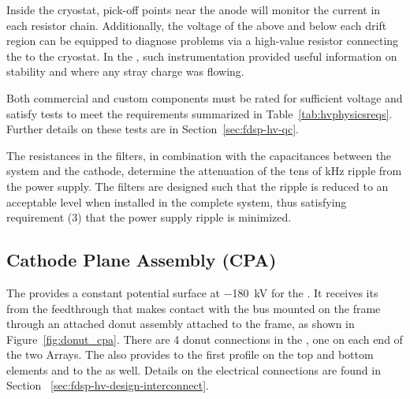 Inside the cryostat, pick-off points near the anode will monitor the current %
in each resistor chain.  Additionally, the voltage of the  above and below each drift region can be equipped to diagnose problems via a high-value resistor connecting the  to the cryostat.  In the , such instrumentation provided useful information on  stability and where any stray charge was flowing.

Both commercial and custom  components must be rated for sufficient voltage and satisfy tests to meet the requirements summarized in Table~\ref{tab:hvphysicsreqs}.  Further details on these tests are in Section~\ref{sec:fdsp-hv-qc}.

The resistances in the filters, in combination with the capacitances between the  system and the cathode,
 determine the attenuation of the tens of \si{\kilo\hertz} ripple from the power supply.  The filters %
are designed such that the ripple is reduced to an acceptable level when installed in the complete system, thus satisfying requirement (3) that the power supply ripple is minimized.

\subsection{Cathode Plane Assembly (CPA)}
The  provides a constant potential surface at \SI{-180}{\kV} for the .  It receives its  from the feedthrough that makes contact with the  bus mounted on the  frame through an attached donut assembly attached to the frame, as shown in Figure~\ref{fig:donut_cpa}. %
There are 4 donut connections in the , one on each end of the two  Arrays. The  also provides  to the first profile on the top and bottom  elements and to the  as well. %
Details on the electrical connections are found in Section ~\ref{sec:fdsp-hv-design-interconnect}.

